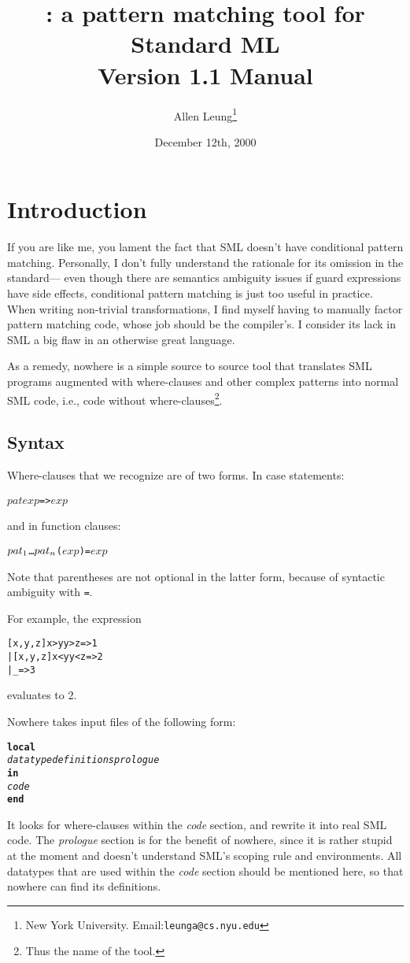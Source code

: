 \documentclass{article}
\title{\Nowhere: a pattern matching tool for Standard ML\\ 
          Version 1.1 Manual
         }
\author{Allen Leung\thanks{New York University. Email:{\tt leunga@cs.nyu.edu}}}
\date{December 12th, 2000}
\newcommand{\nowhere}{{\sf nowhere}}
\newcommand{\Nowhere}{{\sf Nowhere}}
\newcommand{\OF}{{\bf of}}
\begin{document}
   \maketitle
\section{Introduction}
If you are like me, you lament the fact that SML doesn't have conditional
pattern matching.  Personally, I don't fully understand the rationale for its
omission in the standard--- even though there are semantics ambiguity 
issues if guard expressions have side effects, conditional pattern matching
is just too useful in practice.   When writing non-trivial transformations, I
find myself having to manually factor pattern matching code, 
whose job should be the compiler's.
I consider its lack in SML a big flaw in an otherwise great language.

  As a remedy, \nowhere{} is a simple source to source tool that translates
SML programs augmented with where-clauses and other complex patterns
into normal SML code, i.e., code without where-clauses\footnote{Thus the name of the tool.}.  

\subsection{Syntax}
Where-clauses that we recognize are of two forms.
In case statements:
\begin{alltt}
    \(pat\) \WHERE \(exp\) => \(exp\)
\end{alltt}
and in function clauses:
\begin{alltt}
    \(pat\sb{1}\) \ldots \(pat\sb{n}\) \WHERE (\(exp\)) = \(exp\)
\end{alltt}
Note that parentheses are not optional in the latter form, because
of syntactic ambiguity with \verb|=|.

For example, the expression
\begin{alltt}
   \CASE [1,2,3] \OF 
      [x,y,z] \WHERE x>y \ANDALSO y>z => 1
    | [x,y,z] \WHERE x<y \ANDALSO y<z => 2
    | _ => 3
\end{alltt}
evaluates to 2.

\Nowhere{} takes input files of the following form:
\begin{alltt}
{\bf local}
    {\sl datatype definitions prologue}
{\bf in}
    {\sl code}
{\bf end}
\end{alltt}
It looks for where-clauses within the {\sl code} section, and rewrite it into
real SML code.  The {\sl prologue} section is for the benefit
of \nowhere, since it is rather stupid at the moment and doesn't understand
SML's scoping rule and environments.  
All datatypes that are used within the {\sl code}
section should be mentioned here, so that \nowhere{} can find its definitions.
\end{document}
